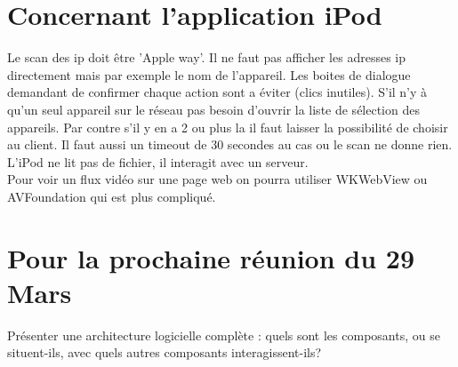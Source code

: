 \documentclass[]{article}
\begin{document}
\section{Concernant l'application iPod}
Le scan des ip doit être 'Apple way'. Il ne faut pas afficher les adresses ip directement mais par exemple le nom de l'appareil. Les boites de dialogue demandant de confirmer chaque action sont a éviter (clics inutiles). S'il n'y à qu'un seul appareil sur le réseau pas besoin d'ouvrir la liste de sélection des appareils. Par contre s'il y en a 2 ou plus la il faut laisser la possibilité de choisir au client. Il faut aussi un timeout de 30 secondes au cas ou le scan ne donne rien.\\
L'iPod ne lit pas de fichier, il interagit avec un serveur.\\
Pour voir un flux vidéo sur une page web on pourra utiliser WKWebView ou AVFoundation qui est plus compliqué.\\

\section{Pour la prochaine réunion du 29 Mars}
Présenter une architecture logicielle complète : quels sont les composants, ou se situent-ils, avec quels autres composants interagissent-ils?
\end{document}
